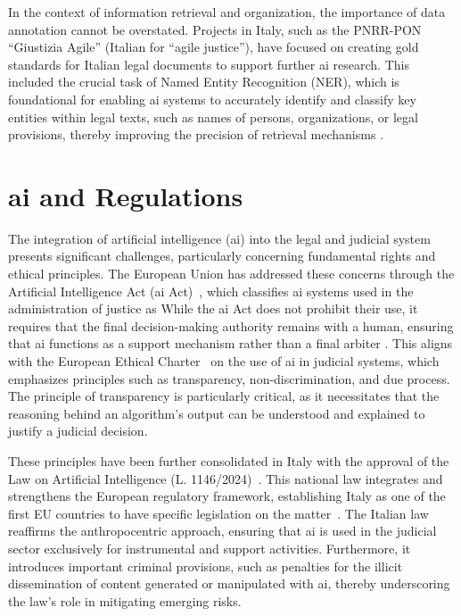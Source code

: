 In the context of information retrieval and organization, the importance of data annotation cannot be overstated. Projects in Italy, such as the PNRR-PON ``Giustizia Agile'' (Italian for ``agile justice''), have focused on creating gold standards for Italian legal documents to support further \ac{ai} research. This included the crucial task of Named Entity Recognition (NER), which is foundational for enabling \ac{ai} systems to accurately identify and classify key entities within legal texts, such as names of persons, organizations, or legal provisions, thereby improving the precision of retrieval mechanisms \cite{juliahb2024}.

\section{\ac{ai} and Regulations}

The integration of artificial intelligence (\ac{ai}) into the legal and judicial system presents significant challenges, particularly concerning fundamental rights and ethical principles. The European Union has addressed these concerns through the Artificial Intelligence Act (\ac{ai} Act)~\cite{ai_act}, which classifies \ac{ai} systems used in the administration of justice as  While the \ac{ai} Act does not prohibit their use, it requires that the final decision-making authority remains with a human, ensuring that \ac{ai} functions as a support mechanism rather than a final arbiter \cite{juliahb2024}. This aligns with the European Ethical Charter~\cite{ethicalcharter2018} on the use of \ac{ai} in judicial systems, which emphasizes principles such as transparency, non-discrimination, and due process. The principle of transparency is particularly critical, as it necessitates that the reasoning behind an algorithm's output can be understood and explained to justify a judicial decision.

These principles have been further consolidated in Italy with the approval of the Law on Artificial Intelligence (L. 1146/2024)~\cite{leggeia2025}. This national law integrates and strengthens the European regulatory framework, establishing Italy as one of the first EU countries to have specific legislation on the matter~\cite{reuters_italy_ai_law_2025}. The Italian law reaffirms the anthropocentric approach, ensuring that \ac{ai} is used in the judicial sector exclusively for instrumental and support activities. Furthermore, it introduces important criminal provisions, such as penalties for the illicit dissemination of content generated or manipulated with \ac{ai}, thereby underscoring the law's role in mitigating emerging risks.

